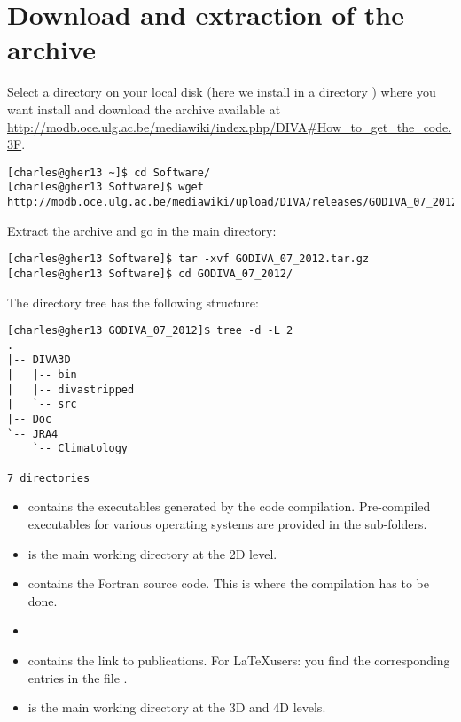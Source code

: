 \section{Download and extraction of the archive}
Select a directory on your local disk (here we install in a directory ) where you want install \diva and download the archive available at \url{http://modb.oce.ulg.ac.be/mediawiki/index.php/DIVA#How_to_get_the_code.3F}.

\begin{lstlisting}[style=Bash]
[charles@gher13 ~]$ cd Software/
[charles@gher13 Software]$ wget http://modb.oce.ulg.ac.be/mediawiki/upload/DIVA/releases/GODIVA_07_2012.tar.gz
\end{lstlisting}

Extract the archive and go in the main directory:
\begin{lstlisting}[style=Bash]
[charles@gher13 Software]$ tar -xvf GODIVA_07_2012.tar.gz
[charles@gher13 Software]$ cd GODIVA_07_2012/
\end{lstlisting}

The directory tree has the following structure: %
\begin{lstlisting}[style=Bash]
[charles@gher13 GODIVA_07_2012]$ tree -d -L 2
.
|-- DIVA3D
|   |-- bin
|   |-- divastripped
|   `-- src
|-- Doc
`-- JRA4
    `-- Climatology

7 directories
\end{lstlisting}


\begin{itemize}
\item {} contains the executables generated by the code compilation. Pre-compiled executables for various operating systems are provided in the sub-folders.
\item {} is the main working directory at the 2D level. 
\item {} contains the Fortran source code. This is where the compilation has to be done.
\item[]
\item {} contains the link to publications. For \LaTeX users: you find the corresponding \BibTeX  entries in the file .
\item {} is the main working directory at the 3D and 4D levels.
\end{itemize}

